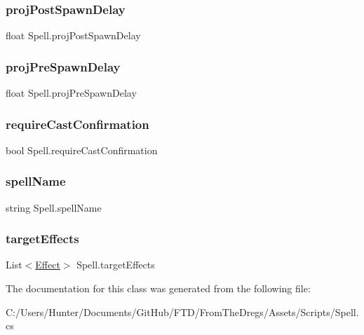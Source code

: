 \subsubsection{\texorpdfstring{projPostSpawnDelay}{projPostSpawnDelay}}
{\footnotesize\ttfamily float Spell.\+proj\+Post\+Spawn\+Delay\hspace{0.3cm}{\ttfamily [get]}}

\mbox{\label{class_spell_a960bdb4e2ddb566e01ebd89ce94e383e}} 
\subsubsection{\texorpdfstring{projPreSpawnDelay}{projPreSpawnDelay}}
{\footnotesize\ttfamily float Spell.\+proj\+Pre\+Spawn\+Delay\hspace{0.3cm}{\ttfamily [get]}}

\mbox{\label{class_spell_a0b207b63bd2f3bf16543af1252bbcc7b}} 
\subsubsection{\texorpdfstring{requireCastConfirmation}{requireCastConfirmation}}
{\footnotesize\ttfamily bool Spell.\+require\+Cast\+Confirmation\hspace{0.3cm}{\ttfamily [get]}}

\mbox{\label{class_spell_a57762a8a1ff7a3b2c901fedc517035e9}} 
\subsubsection{\texorpdfstring{spellName}{spellName}}
{\footnotesize\ttfamily string Spell.\+spell\+Name\hspace{0.3cm}{\ttfamily [get]}}

\mbox{\label{class_spell_a473e9f79ee07b38f43ea942deb6d8c20}} 
\subsubsection{\texorpdfstring{targetEffects}{targetEffects}}
{\footnotesize\ttfamily List$<$\mbox{\hyperlink{class_effect}{Effect}}$>$ Spell.\+target\+Effects\hspace{0.3cm}{\ttfamily [get]}}



The documentation for this class was generated from the following file\+:\begin{DoxyCompactItemize}
\item 
C\+:/\+Users/\+Hunter/\+Documents/\+Git\+Hub/\+F\+T\+D/\+From\+The\+Dregs/\+Assets/\+Scripts/Spell.\+cs\end{DoxyCompactItemize}
